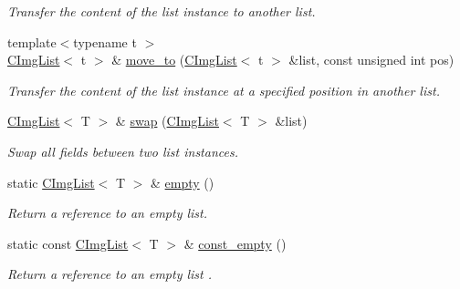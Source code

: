 \begin{DoxyCompactItemize}
\begin{DoxyCompactList}\small\item\em Transfer the content of the list instance to another list. \end{DoxyCompactList}\item 
{\footnotesize template$<$typename t $>$ }\\\hyperlink{structcimg__library__suffixed_1_1CImgList}{C\+Img\+List}$<$ t $>$ \& \hyperlink{structcimg__library__suffixed_1_1CImgList_a8081197e3c7f13f44b79bc16fca76342}{move\+\_\+to} (\hyperlink{structcimg__library__suffixed_1_1CImgList}{C\+Img\+List}$<$ t $>$ \&list, const unsigned int pos)
\begin{DoxyCompactList}\small\item\em Transfer the content of the list instance at a specified position in another list. \end{DoxyCompactList}\item 
\hyperlink{structcimg__library__suffixed_1_1CImgList}{C\+Img\+List}$<$ T $>$ \& \hyperlink{structcimg__library__suffixed_1_1CImgList_ad88b574b18ddf25e9be41d346584236b}{swap} (\hyperlink{structcimg__library__suffixed_1_1CImgList}{C\+Img\+List}$<$ T $>$ \&list)
\begin{DoxyCompactList}\small\item\em Swap all fields between two list instances. \end{DoxyCompactList}\item 
static \hyperlink{structcimg__library__suffixed_1_1CImgList}{C\+Img\+List}$<$ T $>$ \& \hyperlink{structcimg__library__suffixed_1_1CImgList_afa0892dccfa1637ad92f7f453ad747ae}{empty} ()
\begin{DoxyCompactList}\small\item\em Return a reference to an empty list. \end{DoxyCompactList}\item 
\mbox{\label{structcimg__library__suffixed_1_1CImgList_ae37157824423ea01f970917ce45311a8}} 
static const \hyperlink{structcimg__library__suffixed_1_1CImgList}{C\+Img\+List}$<$ T $>$ \& \hyperlink{structcimg__library__suffixed_1_1CImgList_ae37157824423ea01f970917ce45311a8}{const\+\_\+empty} ()
\begin{DoxyCompactList}\small\item\em Return a reference to an empty list . \end{DoxyCompactList}\end{DoxyCompactItemize}
